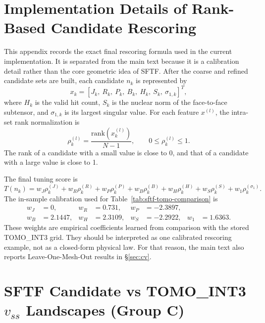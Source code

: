 \documentclass[11pt,a4paper]{article}
\begin{document}
\section{Implementation Details of Rank-Based Candidate Rescoring}
\label{sec:appendix-ranktuning}

This appendix records the exact final rescoring formula used in the current implementation.
It is separated from the main text because it is a calibration detail rather than the core geometric idea of SFTF.
After the coarse and refined candidate sets are built, each candidate $n_k$ is represented by
\begin{equation}
x_k
=
\left[
J_k,\ R_k,\ P_k,\ B_k,\ H_k,\ S_k,\ \sigma_{1,k}
\right]^T ,
\end{equation}
where $H_k$ is the valid hit count, $S_k$ is the nuclear norm of the face-to-face subtensor, and $\sigma_{1,k}$ is its largest singular value.
For each feature $x^{(l)}$, the intra-set rank normalization is
\begin{equation}
\rho^{(l)}_k
=
\frac{\mathrm{rank}(x^{(l)}_k)}{N-1},
\qquad
0\le \rho^{(l)}_k\le 1 .
\end{equation}
The rank of a candidate with a small value is close to 0, and that of a candidate with a large value is close to 1.

The final tuning score is
\begin{equation}
T(n_k)
=
w_J\rho^{(J)}_k
+w_R\rho^{(R)}_k
+w_P\rho^{(P)}_k
+w_B\rho^{(B)}_k
+w_H\rho^{(H)}_k
+w_S\rho^{(S)}_k
+w_1\rho^{(\sigma_1)}_k .
\end{equation}
The in-sample calibration used for Table~\ref{tab:sftf-tomo-comparison} is
\begin{equation}
\begin{aligned}
w_J&=0, &
w_R&=0.731, &
w_P&=-2.3897,\\
w_B&=2.1447, &
w_H&=2.3109, &
w_S&=-2.2922, &
w_1&=1.6363 .
\end{aligned}
\end{equation}
These weights are empirical coefficients learned from comparison with the stored TOMO\_INT3 grid.
They should be interpreted as one calibrated rescoring example, not as a closed-form physical law.
For that reason, the main text also reports Leave-One-Mesh-Out results in \S\ref{sec:cv}.

\section{SFTF Candidate vs TOMO\_INT3 $v_{ss}$ Landscapes (Group C)}
\label{sec:appendix-landscape}
\end{document}
